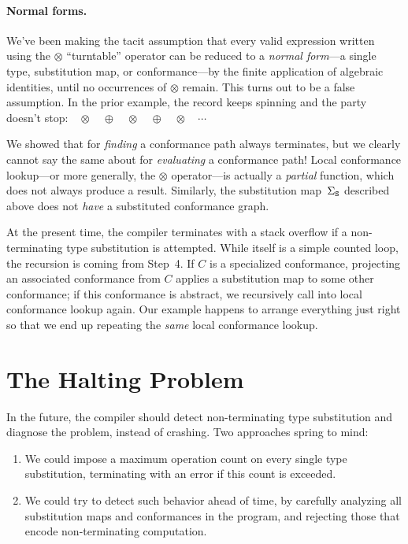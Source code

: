 \documentclass[../generics]{subfiles}
\begin{document}
\paragraph{Normal forms.}
We've been making the tacit assumption that every valid expression written using the $\otimes$ ``turntable'' operator can be reduced to a \emph{normal form}---a single type, substitution map, or conformance---by the finite application of algebraic identities, until no occurrences of $\otimes$ remain. This turns out to be a false assumption. In the prior example, the record keeps spinning and the party doesn't stop:$\quad \otimes \quad \oplus \quad \otimes \quad \oplus \quad \otimes \quad \cdots$

We showed that  for \emph{finding} a conformance path always terminates, but we clearly cannot say the same about  for \emph{evaluating} a conformance path! Local conformance lookup---or more generally, the $\otimes$ operator---is actually a \emph{partial} function, which does not always produce a result. Similarly, the substitution map~$\Sigma_\texttt{S}$ described above does not \emph{have} a substituted conformance graph.

At the present time, the compiler terminates with a stack overflow if a non-terminating type substitution is attempted. While  itself is a simple counted loop, the recursion is coming from Step~4. If $C$ is a specialized conformance, projecting an associated conformance from $C$ applies a substitution map to some other conformance; if this conformance is abstract, we recursively call into local conformance lookup again. Our example happens to arrange everything just right so that we end up repeating the \emph{same} local conformance lookup.

\section{The Halting Problem}\label{sec:halting problem}

In the future, the compiler should detect non-terminating type substitution and diagnose the problem, instead of crashing. Two approaches spring to mind:
\begin{enumerate}
\item We could impose a maximum operation count on every single type substitution, terminating with an error if this count is exceeded.
\item We could try to detect such behavior ahead of time, by carefully analyzing all substitution maps and conformances in the program, and rejecting those that encode non-terminating computation.
\end{enumerate}
\end{document}
